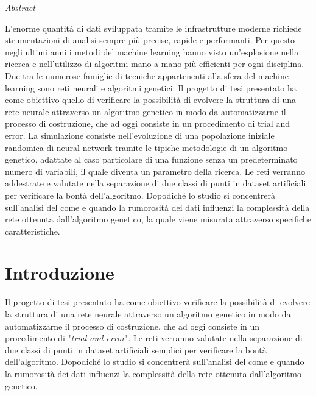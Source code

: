\documentclass[12pt,a4paper]{report}
\begin{document}
\small\tableofcontents

\newpage

\vspace*{150px}
\LARGE\textit{Abstract}
\normalsize

L'enorme quantità di dati sviluppata tramite le infrastrutture moderne richiede strumentazioni di analisi sempre più precise, rapide e performanti. 
Per questo negli ultimi anni i metodi del machine learning hanno visto un'esplosione nella ricerca e nell'utilizzo di algoritmi mano a mano più efficienti per ogni disciplina. 
Due tra le numerose famiglie di tecniche appartenenti alla sfera del machine learning sono reti neurali e algoritmi genetici. 
Il progetto di tesi presentato ha come obiettivo quello di verificare la possibilità di evolvere la struttura di una rete neurale attraverso un algoritmo genetico in modo da automatizzarne il processo di costruzione, che ad oggi consiste in un procedimento di trial and error.
La simulazione consiste nell'evoluzione di una popolazione iniziale randomica di neural network tramite le tipiche metodologie di un algoritmo genetico, adattate al caso particolare di una funzione senza un predeterminato numero di variabili, il quale diventa un parametro della ricerca. 
Le reti verranno addestrate e valutate nella separazione di due classi di punti in dataset artificiali per verificare la bontà dell'algoritmo. 
Dopodiché lo studio si concentrerà sull'analisi del come e quando la rumorosità dei dati influenzi la complessità della rete ottenuta dall'algoritmo genetico, la quale viene misurata attraverso specifiche caratteristiche.

\newpage
\normalsize 

\chapter{Introduzione}

Il progetto di tesi presentato ha come obiettivo verificare la possibilità di evolvere la struttura di una rete neurale attraverso un algoritmo genetico in modo da automatizzarne il processo di costruzione, che ad oggi consiste in un procedimento di "\textit{trial and error}".
Le reti verranno valutate nella separazione di due classi di punti in dataset artificiali semplici per verificare la bontà dell'algoritmo. 
Dopodiché lo studio si concentrerà sull'analisi del come e quando la rumorosità dei dati influenzi la complessità della rete ottenuta dall'algoritmo genetico.
\end{document}
